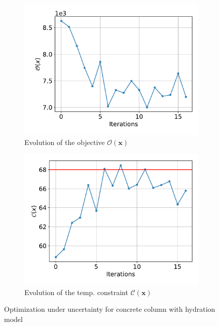 \documentclass[a4paper,11pt]{article}
\begin{document}
\begin{figure}[!htpb]
\begin{subfigure}{0.45\textwidth}
		\includegraphics[width=\textwidth]{fig/objective_opt_2022_10_27-11_09_09_AM.pdf}
		\caption{Evolution of the objective $\mathcal{O}(\bm x)$}
		\label{fig:objective_evolution}
	\end{subfigure}
	\hfill
	\begin{subfigure}{0.45\textwidth}
		\includegraphics[width=\textwidth]{fig/constraints_opt_2022_10_27-11_09_09_AM.pdf}
		\caption{Evolution of the temp. constraint $\mathcal{C}(\bm x)$}
		\label{fig:constraint_evolution}
	\end{subfigure}
	\hfill
	\caption{Optimization under uncertainty for concrete column with hydration model}
	\label{fig:opt_diagnostics_hydration}
\end{figure}
\end{document}

